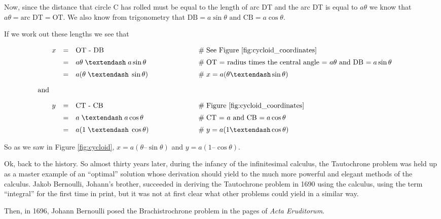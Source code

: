 \documentclass{article}
\theoremstyle{definition}
\begin{document}
\bigskip
\noindent
Now, since the distance that circle C has rolled must be equal to
the length of arc DT and the arc DT is equal to $a \theta$ we know
that $a\theta = \text{arc DT} = \text{OT}$. We also know from
trigonometry that $\text{DB} = a \sin \theta \text{ and } \text{CB}
= a \cos \theta$.  

\bigskip
\noindent
If we work out these lengths we see that

\begin{equation*}
\begin{array}{lllll}
x
&=& \text{OT - DB}   					&\qquad \qquad \qquad \mathrel{\#} \text{See Figure \ref{fig:cycloid_coordinates}} \\
[5pt]
&=& a\theta \; – \; a \sin \theta       &\qquad \qquad \qquad \mathrel{\#} \text{OT = radius times the central angle = $a \theta$ and DB $= a \sin \theta$} \\
[5pt]
&=& a (\theta \; – \; \sin \theta)      &\qquad \qquad \qquad \mathrel{\#} x = a (\theta – \sin \theta) \\
[10pt]
\hspace{-2em} \text{and} \\
[10pt]
y
&=& \text{CT - CB}                      &\qquad \qquad \qquad \mathrel{\#} \text{Figure \ref{fig:cycloid_coordinates}} \\
[5pt]
&=& a \; – \; a \cos \theta             &\qquad \qquad \qquad \mathrel{\#} \text{CT = $a$ and CB $= a \cos \theta$} \\
[5pt]
&=& a (1 \; – \; \cos \theta)           &\qquad \qquad \qquad \mathrel{\#} y = a (1 – \cos \theta) 
\end{array}
\end{equation*}

\bigskip
\noindent
So as we saw in Figure \ref{fig:cycloid}, $x = a (\theta – \sin
\theta)$ and $y = a (1 – \cos \theta)$. 


\bigskip
\noindent
Ok, back to the history. So almost thirty years later, during the
infancy of the infinitesimal calculus, the Tautochrone problem
was held up as a master example of an “optimal” solution whose
derivation should yield to the much more powerful and elegant
methods of the calculus. Jakob Bernoulli, Johann’s brother,
succeeded in deriving the Tautochrone problem in 1690 using the
calculus, using the term “integral” for the first time in print,
but it was not at first clear what other problems could yield in
a similar way. 

\bigskip
\noindent
Then, in 1696, Johann Bernoulli posed the Brachistrochrone
problem in the pages of \emph{Acta Eruditorum}.   
\end{document}
